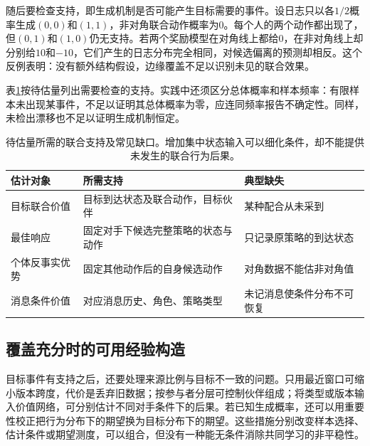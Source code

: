 随后要检查支持，即生成机制是否可能产生目标需要的事件。设日志只以各$1/2$概率生成$(0,0)$和$(1,1)$，非对角联合动作概率为0。每个人的两个动作都出现了，但$(0,1)$和$(1,0)$仍无支持。若两个奖励模型在对角线上都给0，在非对角线上却分别给$10$和$-10$，它们产生的日志分布完全相同，对候选偏离的预测却相反。这个反例表明：没有额外结构假设，边缘覆盖不足以识别未见的联合效果。

表\ref{tab:rl-multi-agent-support}按待估量列出需要检查的支持。实践中还须区分总体概率和样本频率：有限样本未出现某事件，不足以证明其总体概率为零，应连同频率报告不确定性。同样，未检出漂移也不足以证明生成机制恒定。

\begin{table}[htbp]
 \centering
 \begin{tabularx}{\linewidth}{@{}l >{\raggedright\arraybackslash}X >{\raggedright\arraybackslash}X@{}}
 \toprule
 估计对象 & 所需支持 & 典型缺失\\
 \midrule
 目标联合价值 & 目标到达状态及联合动作，目标伙伴 & 某种配合从未采到\\
 最佳响应 & 固定对手下候选完整策略的状态与动作 & 只记录原策略的到达状态\\
 个体反事实优势 & 固定其他动作后的自身候选动作 & 对角数据不能估非对角值\\
 消息条件价值 & 对应消息历史、角色、策略类型 & 未记消息使条件分布不可恢复\\
 \bottomrule
 \end{tabularx}
 \caption{待估量所需的联合支持及常见缺口。增加集中状态输入可以细化条件，却不能提供未发生的联合行为后果。}
 \label{tab:rl-multi-agent-support}
\end{table}

\subsection{覆盖充分时的可用经验构造}
\label{sec:rl-multi-agent-reweight}

目标事件有支持之后，还要处理来源比例与目标不一致的问题。只用最近窗口可缩小版本跨度，代价是丢弃旧数据；按参与者分层可控制伙伴组成；将类型或版本输入价值网络，可分别估计不同对手条件下的后果。若已知生成概率，还可以用重要性校正把行为分布下的期望换为目标分布下的期望。这些措施分别改变样本选择、估计条件或期望测度，可以组合，但没有一种能无条件消除共同学习的非平稳性。

